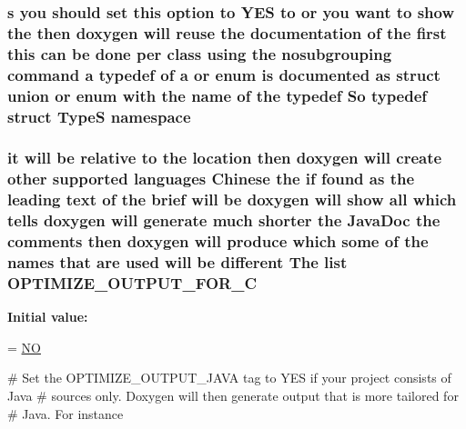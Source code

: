 \hypertarget{sdlgamepad_8dox_a525af27f938795208a10ce5261c76978}{
\subsubsection[{namespace}]{ {\bf s} you should {\bf set} this option to Y\-E\-S to or you want to show the then doxygen will reuse the documentation of the {\bf first} this can be {\bf done} per class using the nosubgrouping command {\bf a} typedef of {\bf a} or enum is documented as {\bf struct} {\bf union} or enum with the {\bf name} of the typedef So typedef {\bf struct} {\bf Type\-S}  namespace}}\label{sdlgamepad_8dox_a525af27f938795208a10ce5261c76978}
\hypertarget{sdlgamepad_8dox_aa542a8f1572d888d9ecd0f903a299444}{
\subsubsection[{O\-P\-T\-I\-M\-I\-Z\-E\-\_\-\-O\-U\-T\-P\-U\-T\-\_\-\-F\-O\-R\-\_\-\-C}]{\setlength{\rightskip}{0pt plus 5cm}it will be relative to the {\bf location} then doxygen will create other supported languages {\bf Chinese} the {\bf if} found as the leading text of the brief will be doxygen will show all which tells doxygen will generate much shorter the Java\-Doc the comments then doxygen will produce which some of the names that {\bf are} used will be different The list O\-P\-T\-I\-M\-I\-Z\-E\-\_\-\-O\-U\-T\-P\-U\-T\-\_\-\-F\-O\-R\-\_\-\-C}}\label{sdlgamepad_8dox_aa542a8f1572d888d9ecd0f903a299444}
{\bfseries Initial value\-:}
\begin{DoxyCode}
= \hyperlink{sdlgamepad_8dox_a0f6a46245280dc38baf9600906aa1393}{NO}

\textcolor{preprocessor}{# Set the OPTIMIZE\_OUTPUT\_JAVA tag to YES if your project consists of Java}
\textcolor{preprocessor}{}\textcolor{preprocessor}{# sources only. Doxygen will then generate output that is more tailored for}
\textcolor{preprocessor}{# Java. For instance}
\end{DoxyCode}


